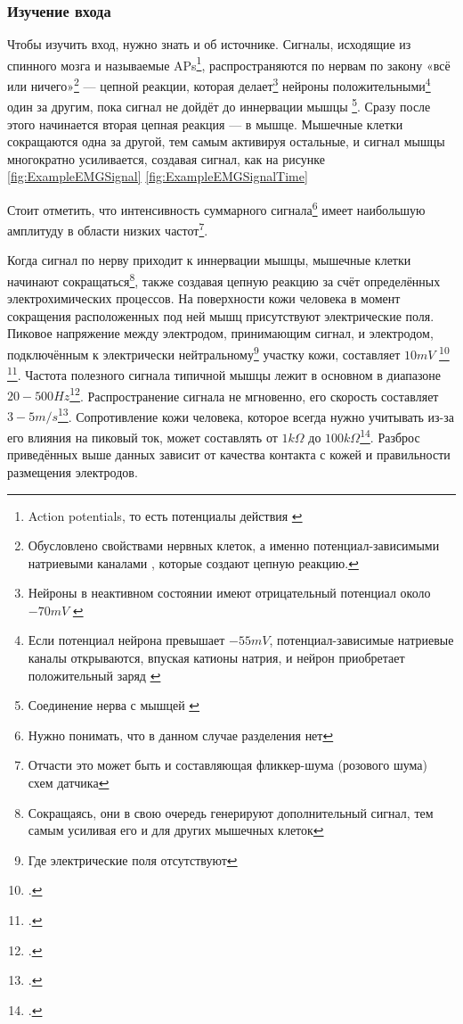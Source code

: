 \documentclass[a4paper, 10pt, final]{article} %
\newcommand{\parenciteit}[2]{\textit{\parencite[#1]{#2}}} %
\begin{document}
    \subsubsection{Изучение входа}\label{sec:SensorboardDesignInput}
    Чтобы изучить вход, нужно знать и об источнике.
    Сигналы, исходящие из спинного мозга и называемые APs\footnote{Action potentials, то есть потенциалы действия \parenciteit{}{MerlettiMuceli}}, распространяются по нервам по закону «всё или ничего»\footnote{Обусловлено свойствами нервных клеток, а именно потенциал-зависимыми натриевыми каналами \parenciteit{}{SodiumChannel:Wiki}, которые создают цепную реакцию.} --- цепной реакции, которая делает\footnote{Нейроны в неактивном состоянии имеют отрицательный потенциал около $-70mV$ \parenciteit{}{AP:Wiki}} нейроны положительными\footnote{Если потенциал нейрона превышает $-55mV$, потенциал-зависимые натриевые каналы открываются, впуская катионы натрия, и нейрон приобретает положительный заряд \parenciteit{}{AP:Wiki}} один за другим, пока сигнал не дойдёт до иннервации мышцы \footnote{Соединение нерва с мышцей \parenciteit{«NMJ» и «innervation zone» p3}{MerlettiMuceli}}.
    Сразу после этого начинается вторая цепная реакция --- в мышце.
    Мышечные клетки сокращаются одна за другой, тем самым активируя остальные, и сигнал мышцы  многократно усиливается, создавая сигнал, как на рисунке \ref{fig:ExampleEMGSignal} \ref{fig:ExampleEMGSignalTime}

    Стоит отметить, что интенсивность суммарного сигнала\footnote{Нужно понимать, что в данном случае разделения нет } имеет наибольшую амплитуду в области низких частот\footnote{Отчасти это может быть и составляющая фликкер-шума (розового шума) схем датчика}.

    Когда сигнал по нерву приходит к иннервации мышцы, мышечные клетки начинают сокращаться\footnote{Сокращаясь, они в свою очередь генерируют дополнительный сигнал, тем самым усиливая его и для других мышечных клеток}, также создавая цепную реакцию за счёт определённых электрохимических процессов.
    На поверхности кожи человека в момент сокращения расположенных под ней мышц присутствуют электрические поля.
    Пиковое напряжение между электродом, принимающим сигнал, и электродом, подключённым к электрически нейтральному\footnote{Где электрические поля отсутствуют} участку кожи, составляет $10mV$ \footcite[p435]{Naik}\: \footcite[p1]{Xiaoou}.
    Частота полезного сигнала типичной мышцы лежит в основном в диапазоне $20-500Hz$\footcite[p1]{EMGFreq}.
    Распространение сигнала не мгновенно, его скорость составляет $3-5m/s$\footcite[p2]{MerlettiMuceli}.
    Сопротивление кожи человека, которое всегда нужно учитывать из-за его влияния на пиковый ток, может составлять от $1k\Omega$ до $100k\Omega$\footcite[``Under dry conditions, the resistance offered by the human body may be as high as 100,000Ohms.  Wet or broken skin may drop the body's resistance to 1,000 Ohms'', p7]{ElectricalDeaths}.
    Разброс приведённых выше данных зависит от качества контакта с кожей и правильности размещения электродов.
\end{document}

